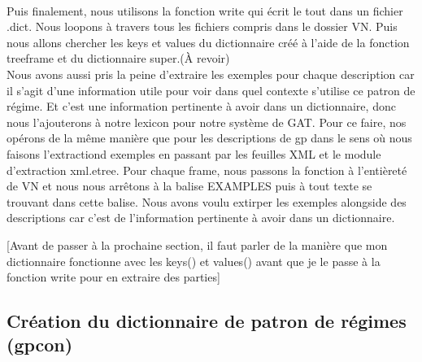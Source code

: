 \documentclass[12pt,maitrise,frenchb,natbib,twoside,initial]{dms}
\numberwithin{equation}{section}
\numberwithin{table}{chapter}
\numberwithin{figure}{chapter}
\begin{document}
\\[12pt]
Puis finalement, nous  utilisons la fonction write qui écrit le tout dans un fichier .dict. Nous loopons à travers tous les fichiers compris dans le dossier VN. Puis nous allons chercher les keys et values du dictionnaire créé à l'aide de la fonction treeframe et du dictionnaire super.(À revoir)
\\[12pt]
Nous avons aussi pris la peine d'extraire les exemples pour chaque description car il s'agit d'une information utile pour voir dans quel contexte s'utilise ce patron de régime. Et c'est une information pertinente à avoir dans un dictionnaire, donc nous l'ajouterons à notre lexicon pour notre système de GAT. Pour ce faire, nos opérons de la même manière que pour les descriptions de gp dans le sens où nous faisons l'extractiond exemples en passant par les feuilles XML et le module d'extraction xml.etree. Pour chaque frame, nous passons la fonction à l'entièreté de VN et nous nous arrêtons à la balise EXAMPLES puis à tout texte se trouvant dans cette balise. Nous avons voulu extirper les exemples alongside des descriptions car c'est de l'information pertinente à avoir dans un dictionnaire.

[Avant de passer à la prochaine section, il faut parler de la manière que mon dictionnaire fonctionne avec les keys() et values() avant que je le passe à la fonction write pour en extraire des parties]

\subsection{Création du dictionnaire de patron de régimes (gpcon)}
\end{document}
